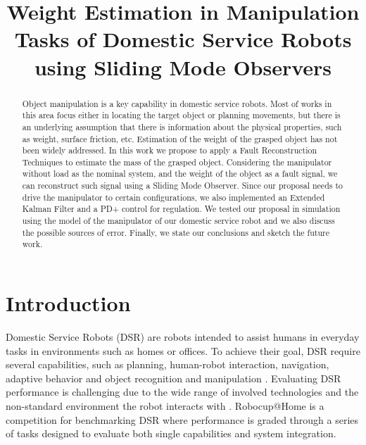 \documentclass[conference,letterpaper]{ieeeconf}
\title{Weight Estimation in Manipulation Tasks of Domestic Service Robots using Sliding Mode Observers}
\author{
 \authorblockN{Marco Negrete\authorrefmark{1}, Jesús Savage\authorrefmark{1}, José Avendaño\authorrefmark{2}}
 \authorblockA{\authorrefmark{1} National Autonomous University of Mexico, Biorobotics Laboratory}
 \authorblockA{\authorrefmark{2} The MathWorks Inc, Student Competitions Team }
}
\begin{document}
\maketitle
\begin{abstract}
  Object manipulation is a key capability in domestic service robots. Most of works in this area focus either in locating the target object or planning movements, but there is an underlying assumption that there is information about the physical properties, such as weight, surface friction, etc. Estimation of the weight of the grasped object has not been widely addressed. In this work we propose to apply a Fault Reconstruction Techniques to estimate the mass of the grasped object. Considering the manipulator without load as the nominal system, and the weight of the object as a fault signal, we can reconstruct such signal using a Sliding Mode Observer. Since our proposal needs to drive the manipulator to certain configurations, we also implemented an Extended Kalman Filter and a PD+ control for regulation. We tested our proposal in simulation using the model of the manipulator of our domestic service robot and we also discuss the possible sources of error. Finally, we state our conclusions and sketch the future work. 
\end{abstract}




\section{Introduction}
Domestic Service Robots (DSR) are robots intended to assist humans in everyday tasks in environments such as homes or offices. To achieve their goal, DSR require several capabilities, such as planning, human-robot interaction, navigation, adaptive behavior and object recognition and manipulation \cite{hutchison_robocuphome_2010}. Evaluating DSR performance is challenging due to the wide range of involved technologies and the non-standard environment the robot interacts with \cite{wisspeintner_robocuphome_2009}. Robocup@Home is a competition for benchmarking DSR where performance is graded through a series of tasks designed to evaluate both single capabilities and system integration. 
\end{document}
